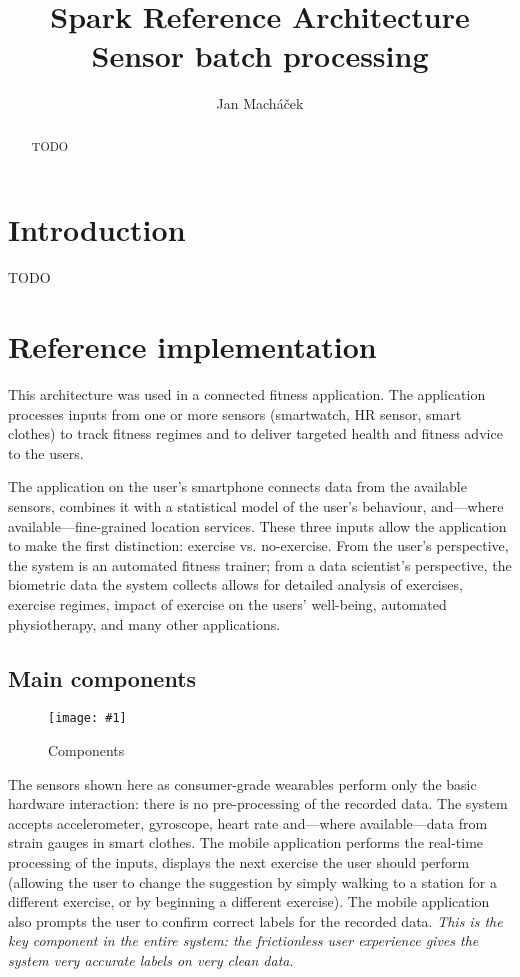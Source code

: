 \documentclass[a4paper, 10 pt, conference]{IEEEtran}
\title{Spark Reference Architecture \\ Sensor batch processing}
\author{Jan Mach{\'a}\v{c}ek%
}
\newcommand{\fig}[3]{
  \begin{figure}[h]
    \begin{center}
        \caption{#3}
        \texttt{[image: \#1]}
        \label{fig:#2}
    \end{center}
  \end{figure}
}
\begin{document}
\maketitle
\thispagestyle{empty}
\pagestyle{empty}

\begin{abstract}

TODO

\end{abstract}


\section{Introduction}

TODO

\section{Reference implementation}

This architecture was used in a connected fitness application. The application processes inputs from one or more sensors (smartwatch, HR sensor, smart clothes) to track fitness regimes and to deliver targeted health and fitness advice to the users. 

The application on the user's smartphone connects data from the available sensors, combines it with a statistical model of the user's behaviour, and---where available---fine-grained location services. These three inputs allow the application to make the first distinction: exercise vs. no-exercise. From the user's perspective, the system is an automated fitness trainer; from a data scientist's perspective, the biometric data the system collects allows for detailed analysis of exercises, exercise regimes, impact of exercise on the users' well-being, automated physiotherapy, and many other applications.

\subsection{Main components}

\fig{ri-arch.png}{components}{Components}

The sensors shown here as consumer-grade wearables perform only the basic hardware interaction: there is no pre-processing of the recorded data. The system accepts accelerometer, gyroscope, heart rate and---where available---data from strain gauges in smart clothes. The mobile application performs the real-time processing of the inputs, displays the next exercise the user should perform (allowing the user to change the suggestion by simply walking to a station for a different exercise, or by beginning a different exercise). The mobile application also prompts the user to confirm correct labels for the recorded data. \emph{This is the key component in the entire system: the frictionless user experience gives the system very accurate labels on very clean data}.
\end{document}
